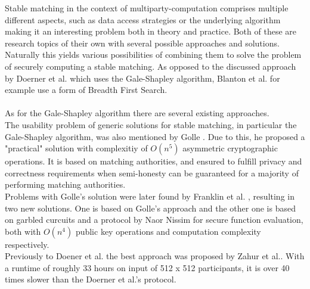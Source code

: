 Stable matching in the context of multiparty-computation comprises multiple different aspects, such as data access strategies or the underlying algorithm making it an interesting problem both in theory and practice. Both of these are research topics of their own with several possible approaches and solutions. Naturally this yields various possibilities of combining them to solve the problem of securely computing a stable matching. As opposed to the discussed approach by Doerner et al.  which uses the Gale-Shapley algorithm, Blanton et al.  for example use a form of Breadth First Search.\\
\ \\As for the Gale-Shapley algorithm there are several existing approaches. 
\ \\The usability problem of generic solutions for stable matching, in particular the Gale-Shapley algorithm, was also mentioned by Golle . Due to this, he proposed a "practical" solution with complexitiy of $O(n^5)$ asymmetric cryptographic operations. It is based on matching authorities, and ensured to fulfill privacy and correctness requirements when semi-honesty can be guaranteed for a majority of performing matching authorities. \\
Problems with Golle's solution were later found by Franklin et al. , resulting in two new solutions. One is based on Golle's approach and the other one is based on garbled curcuits and a protocol by Naor Nissim for secure function evaluation, both with $O(n^4)$ public key operations and computation complexity respectively.\\
Previously to Doener et al. the best approach was proposed by Zahur et al.. With a runtime of roughly 33 hours on input of 512 x 512 participants, it is over 40 times slower than the Doerner et al.'s protocol. 
